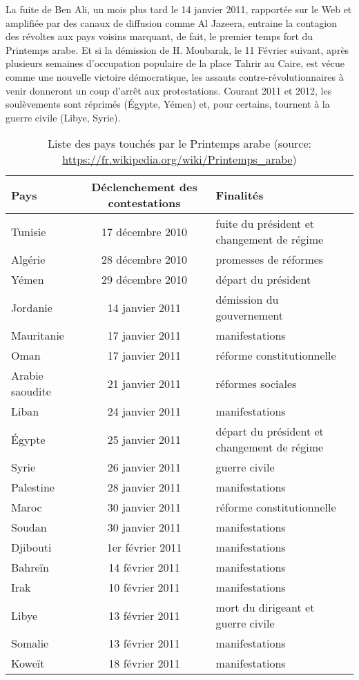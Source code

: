 \documentclass[symmetric,justified,marginals=raggedouter]{tufte-book}
\begin{document}
La fuite de Ben Ali, un mois plus tard le 14 janvier 2011, rapportée sur le Web et amplifiée par des canaux de diffusion comme Al Jazeera, entraine la contagion des révoltes aux pays voisins marquant, de fait, le premier temps fort du Printemps arabe. Et si la démission de H. Moubarak, le 11 Février suivant, après plusieurs semaines d'occupation populaire de la place Tahrir au Caire, est vécue comme une nouvelle victoire démocratique, les assauts contre-révolutionnaires à venir donneront un coup d'arrêt aux protestations. Courant 2011 et 2012, les soulèvements sont réprimés (Égypte, Yémen) et, pour certains, tournent à la guerre civile (Libye, Syrie). \\

\begin{table*}
  \label{tab:printemps}
  \begin{tabular}{lcl}
    \toprule
    Pays&Déclenchement des contestations&Finalités\\
    \midrule
Tunisie&17 décembre 2010&fuite du président et changement de régime\\
Algérie&28 décembre 2010&promesses de réformes\\
Yémen&29 décembre 2010&départ du président\\
Jordanie&14 janvier 2011&démission du gouvernement\\
Mauritanie&17 janvier 2011&manifestations\\
Oman&17 janvier 2011&réforme constitutionnelle\\
Arabie saoudite&21 janvier 2011&réformes sociales\\
Liban&24 janvier 2011&manifestations\\
Égypte&25 janvier 2011&départ du président et changement de régime\\
Syrie&26 janvier 2011&guerre civile\\
Palestine&28 janvier 2011&manifestations\\
Maroc&30 janvier 2011&réforme constitutionnelle\\
Soudan&30 janvier 2011&manifestations\\
Djibouti&1er février 2011&manifestations\\
Bahreïn&14 février 2011&manifestations\\
Irak&10 février 2011&manifestations\\
Libye&13 février 2011&mort du dirigeant et guerre civile\\
Somalie&13 février 2011&manifestations\\
Koweït&18 février 2011&manifestations\\
  \bottomrule
  \end{tabular}
  \bigskip
  \caption{Liste des pays touchés par le Printemps arabe (source: \url{https://fr.wikipedia.org/wiki/Printemps_arabe})}
\end{table*}
\end{document}
